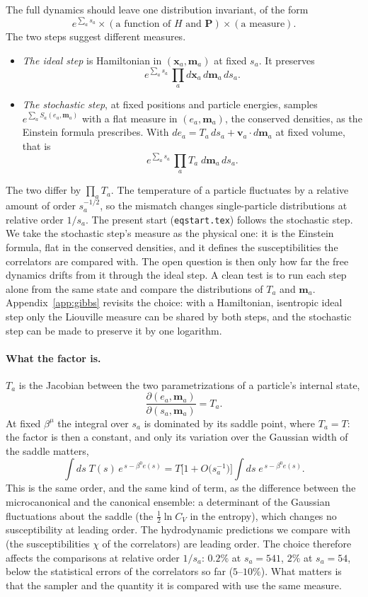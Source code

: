 \documentclass[11pt,aps,preprint,nofootinbib,superscriptaddress,tightenlines]{revtex4-2}
\def\st{\begin{equation}}
\def\stp{\end{equation}}
\let\oldparagraph\paragraph
\renewcommand{\paragraph}{\par\bigskip\oldparagraph}
\begin{document}
The full dynamics should leave one distribution invariant, of the form
\st
e^{\sum_as_a}\times(\text{a function of }H\text{ and }\bm P)\times(\text{a measure}).
\stp
The two steps suggest different measures.
\begin{itemize}
\item \emph{The ideal step} is Hamiltonian in $(\bm x_a,\bm m_a)$ at fixed $s_a$.  It preserves
  \st
  e^{\sum_as_a}\,\prod_ad\bm x_a\,d\bm m_a\,ds_a .
  \stp
\item \emph{The stochastic step}, at fixed positions and particle energies, samples $e^{\sum_aS_a(e_a,\bm m_a)}$ with a flat measure
  in $(e_a,\bm m_a)$, the conserved densities, as the Einstein formula prescribes.  With $de_a=T_a\,ds_a+\bm v_a\cdot d\bm m_a$ at fixed
  volume, that is
  \st
  e^{\sum_as_a}\,\prod_aT_a\;d\bm m_a\,ds_a .
  \stp
\end{itemize}
The two differ by $\prod_aT_a$.  The temperature of a particle fluctuates by a relative amount of order $s_a^{-1/2}$, so the
mismatch changes single-particle distributions at relative order $1/s_a$.  The present start (\texttt{eqstart.tex}) follows
the stochastic step.  We take the stochastic step's measure as the physical one: it is the Einstein formula, flat in the
conserved densities, and it defines the susceptibilities the correlators are compared with.  The open question is then
only how far the free dynamics drifts from it through the ideal step.  A clean test is to run each step alone from the
same state and compare the distributions of $T_a$ and $\bm m_a$.  Appendix~\ref{app:gibbs} revisits the choice: with a
Hamiltonian, isentropic ideal step only the Liouville measure can be shared by both steps, and the stochastic step can be
made to preserve it by one logarithm.

\paragraph{What the factor is.}  $T_a$ is the Jacobian between the two parametrizations of a particle's internal state,
\st
\frac{\partial(e_a,\bm m_a)}{\partial(s_a,\bm m_a)}=T_a .
\stp
At fixed $\beta^\mu$ the integral over $s_a$ is dominated by its saddle point, where $T_a=T$: the factor is then a constant, and
only its variation over the Gaussian width of the saddle matters,
\st
\int ds\;T(s)\,e^{\,s-\beta^0e(s)}=T\Big[1+O\big(s_a^{-1}\big)\Big]\int ds\;e^{\,s-\beta^0e(s)} .
\stp
This is the same order, and the same kind of term, as the difference between the microcanonical and the canonical
ensemble: a determinant of the Gaussian fluctuations about the saddle (the $\tfrac12\ln C_V$ in the entropy), which changes no
susceptibility at leading order.  The hydrodynamic predictions we compare with (the susceptibilities $\chi$ of the
correlators) are leading order.  The choice therefore affects the comparisons at relative order $1/s_a$: $0.2\%$ at $s_a=541$, $2\%$
at $s_a=54$, below the statistical errors of the correlators so far ($5$--$10\%$).  What matters is that the sampler and the
quantity it is compared with use the same measure.
\end{document}
